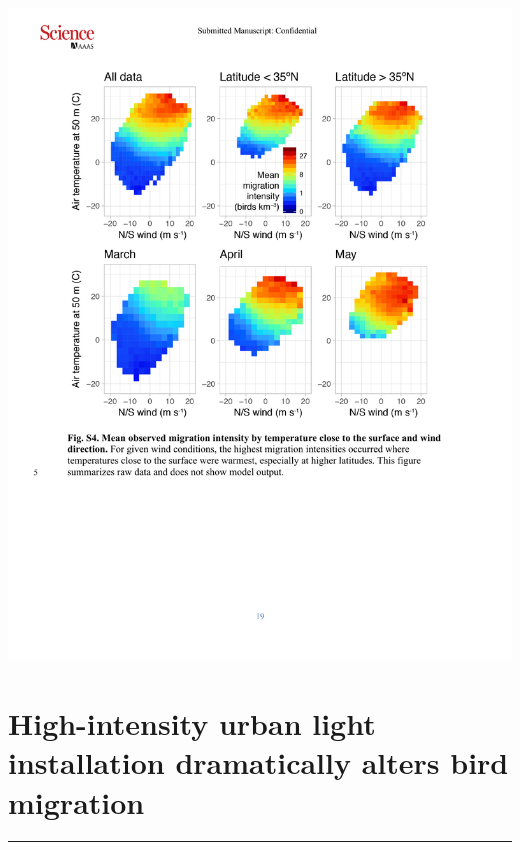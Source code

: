 \documentclass[a4paper, twoside]{templates/ociamthesis}
\begin{document}
\includegraphics[width=1\linewidth]{pdf_chapters/forecast/forecast_supp_crop_Part9}

\hypertarget{high-intensity-lights}{%
\chapter{High-intensity urban light installation dramatically alters bird migration}\label{high-intensity-lights}}

\minitoc 

\begin{center}\rule{0.5\linewidth}{\linethickness}\end{center}
\end{document}
